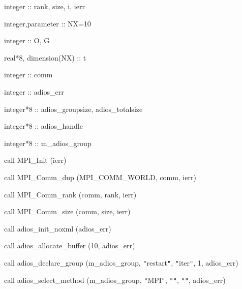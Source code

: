 \vspace{10pt}
\parindent=14pt
integer                 :: rank, size, i, ierr

\vspace{10pt}
integer,parameter       :: NX=10

\vspace{10pt}
\parindent=28pt
integer                 :: O, G

\vspace{10pt}
\parindent=14pt
real*8, dimension(NX)   :: t

\vspace{10pt}
integer                 :: comm

\vspace{22pt}
\parindent=28pt
integer                 :: adios\_err

\vspace{10pt}
\parindent=14pt
integer*8               :: adios\_groupsize, adios\_totalsize

\vspace{10pt}
integer*8               :: adios\_handle

\vspace{10pt}
\parindent=28pt
integer*8               :: m\_adios\_group

\vspace{22pt}
\parindent=14pt
call MPI\_Init (ierr)

\vspace{10pt}
call MPI\_Comm\_dup (MPI\_COMM\_WORLD, comm, ierr)

\vspace{10pt}
\parindent=28pt
call MPI\_Comm\_rank (comm, rank, ierr)

\vspace{10pt}
\parindent=14pt
call MPI\_Comm\_size (comm, size, ierr)

\vspace{22pt}
call adios\_init\_noxml (adios\_err)

\vspace{10pt}
\parindent=28pt
call adios\_allocate\_buffer (10, adios\_err)

\vspace{22pt}
\parindent=14pt
call adios\_declare\_group (m\_adios\_group, \texttt{"}restart\texttt{"}, \texttt{"}iter\texttt{"}, 
1, adios\_err)

\vspace{10pt}
call adios\_select\_method (m\_adios\_group, \texttt{"}MPI\texttt{"}, \texttt{"}\texttt{"}, 
\texttt{"}\texttt{"}, adios\_err)

